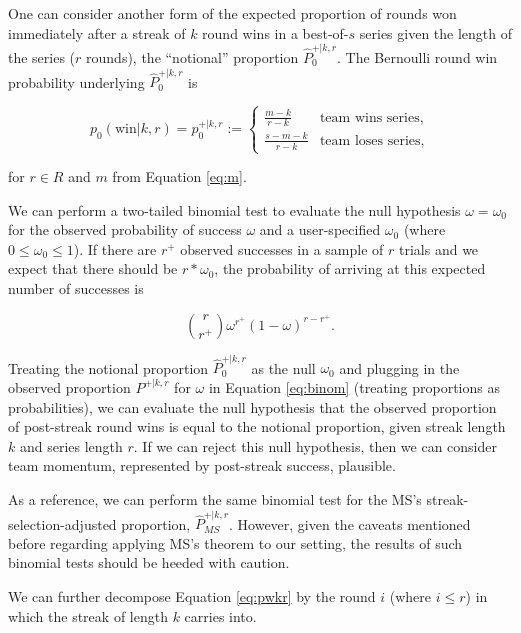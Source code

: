 \documentclass{article}
\begin{document}
One can consider another form of the expected proportion of rounds won
immediately after a streak of \(k\) round wins in a best-of-\(s\) series
given the length of the series (\(r\) rounds), the ``notional''
proportion \(\hat{P}^{+|k,r}_0\). The Bernoulli round win probability
underlying \(\hat{P}^{+|k,r}_0\) is

\begin{equation}\label{eq:pwkr}
p_0(\text{win} | k, r) = p^{+|k,r}_0 := \begin{cases}
  \frac{m - k}{r - k} & \text{team wins series}, \\
  \frac{s - m - k}{r - k} & \text{team loses series},
\end{cases}
\end{equation}

for \(r \in R\) and \(m\) from Equation \ref{eq:m}.

We can perform a two-tailed binomial test to evaluate the null
hypothesis \(\omega = \omega_0\) for the observed probability of success
\(\omega\) and a user-specified \(\omega_0\) (where
\(0 \leq \omega_0 \leq 1\)). If there are \(r^+\) observed successes in
a sample of \(r\) trials and we expect that there should be
\(r * \omega_0\), the probability of arriving at this expected number of
successes is

\begin{equation}\label{eq:binom}
\binom {r}{r^+} \omega^{r^+}(1-\omega)^{r-r^+}.
\end{equation}

Treating the notional proportion \(\hat{P}^{+|k,r}_0\) as the null
\(\omega_0\) and plugging in the observed proportion \(P^{+|k,r}\) for
\(\omega\) in Equation \ref{eq:binom} (treating proportions as
probabilities), we can evaluate the null hypothesis that the observed
proportion of post-streak round wins is equal to the notional
proportion, given streak length \(k\) and series length \(r\). If we can
reject this null hypothesis, then we can consider team momentum,
represented by post-streak success, plausible.

As a reference, we can perform the same binomial test for the MS's
streak-selection-adjusted proportion, \(\hat{P}^{+|k,r}_{MS}\). However,
given the caveats mentioned before regarding applying MS's theorem to
our setting, the results of such binomial tests should be heeded with
caution.

We can further decompose Equation \ref{eq:pwkr} by the round \(i\)
(where \(i \leq r\)) in which the streak of length \(k\) carries into.
\end{document}

